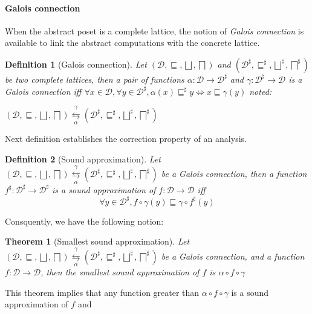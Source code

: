 \documentclass[submission,copyright,creativecommons]{eptcs}
\newtheorem{definition}{Definition}
\newtheorem{theorem}{Theorem}
\newcommand{\sh}[1]{\ensuremath{#1^\sharp}}
\begin{document}
\paragraph{Galois connection}
When the abstract poset is a complete lattice, the notion of {\it Galois connection} is available
to link the abstract computations with the concrete lattice. 

\begin{definition}[Galois connection]
Let $(\mathcal{D}, \sqsubseteq, \bigsqcup, \bigsqcap)$  
and $(\sh{\mathcal{D}}, \sh{\sqsubseteq}, \sh{\bigsqcup}, \sh{\bigsqcap})$ be two complete lattices,
then a pair of functions
$\alpha : \mathcal{D} \rightarrow \sh{\mathcal{D}}$ and
$\gamma : \sh{\mathcal{D}} \rightarrow  \mathcal{D}$ is a {\it Galois connection} iff
$\forall x \in \mathcal{D}, \forall y \in \sh{\mathcal{D}}, \alpha(x) \sh{\sqsubseteq} y \iff x \sqsubseteq \gamma(y)$
noted:
\begin{center}
$(\mathcal{D}, \sqsubseteq, \bigsqcup, \bigsqcap) \overset{\gamma}{\underset{\alpha}{\leftrightarrows}} 
(\mathcal{D}^\sharp, \sqsubseteq^\sharp, \bigsqcup^\sharp, \sh{\bigsqcap})
$
\end{center}
\end{definition}
\noindent
Next definition establishes the correction property of an analysis.
\begin{definition}[Sound approximation]\label{correct-app}
Let 
$(\mathcal{D}, \sqsubseteq, \bigsqcup, \bigsqcap) \overset{\gamma}{\underset{\alpha}{\leftrightarrows}} (\mathcal{D}^\sharp, \sqsubseteq^\sharp, \bigsqcup^\sharp, \sh{\bigsqcap}) $ be a Galois connection, then a function
$\sh{f} : \sh{\mathcal{D}} \rightarrow \sh{\mathcal{D}}$
is a {\it sound approximation} of $f : \mathcal{D} \rightarrow \mathcal{D}$ iff
$$ \forall y \in \mathcal{D}^{\sharp}, f \circ \gamma (y) \sqsubseteq \gamma \circ f^\sharp(y) $$
\end{definition}
\noindent
Consquently, we have the following notion:
\begin{theorem} [Smallest sound approximation]
 \label{theo:approx}
Let $(\mathcal{D}, \sqsubseteq, \bigsqcup, \bigsqcap) \overset{\gamma}{\underset{\alpha}{\leftrightarrows}} (\mathcal{D}^\sharp, \sqsubseteq^\sharp, \bigsqcup^\sharp,\sh{\bigsqcap}) $ be a Galois connection,
and a function $f : \mathcal{D} \rightarrow \mathcal{D}$, then the {\it smallest sound approximation} of $f$
is $\alpha \circ f \circ \gamma$
\end{theorem}
\noindent
This theorem implies that any function greater than
$\alpha \circ f \circ \gamma$ is a sound approximation of $f$ and
\end{document}
